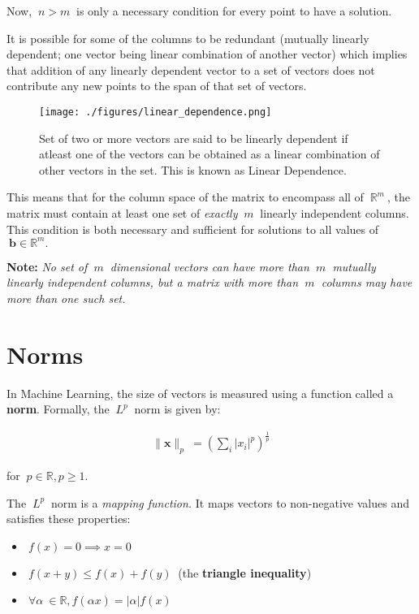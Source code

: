\documentclass[12pt]{article}
\begin{document}
Now, $\ n>m\ $ is only a necessary condition for every point to have a solution.

It is possible for some of the columns to be redundant (mutually linearly dependent; one vector being linear combination of another vector) which implies that addition of any linearly dependent vector to a set of vectors does not contribute any new points to the span of that set of vectors.

\begin{figure}[h]
\texttt{[image: ./figures/linear\_dependence.png]}
\caption{Set of two or more vectors are said to be linearly dependent if atleast one of the vectors can be obtained as a linear combination of other vectors in the set. This is known as Linear Dependence.}
\end{figure}

This means that for the column space of the matrix to encompass all of $\ \mathbb{R}^{m}\ $, the matrix must contain at least one set of \textit{exactly} $\ m\ $ linearly independent columns. This condition is both necessary and sufficient for solutions to all values of $\ \mathbf{b}\in\mathbb{R}^{m}.$

\textbf{Note:} \textit{No set of $\ m\ $ dimensional vectors can have more than $\ m\ $ mutually linearly independent columns, but a matrix with more than $\ m\ $ columns may have more than one such set.}

\section{Norms}

In Machine Learning, the size of vectors is measured using a function called a \textbf{norm}. Formally, the $\ L^{p}\ $ norm is given by:

\begin{align}
\|\mathbf{x}\|_{p} \  = \left( \sum_i \left| x_i \right| ^p \right) ^ {\frac {1}{p}}
\end{align}

for $\ p \in \mathbb{R}, p \ge 1. \ $

The $\ L^{p}\ $ norm is a \textit{mapping function.} It maps vectors to non-negative values and satisfies these properties:

\begin{itemize}
    \item $\ f(x) = 0 \implies x = 0 \ $
    \item $\ f(x+y) \le f(x) + f(y)\ $ (the \textbf{triangle inequality})
    \item $\ \forall \alpha \ \in \mathbb{R}, f(\alpha x) = \left| \alpha \right|f(x) \ $
\end{itemize}
\end{document}
